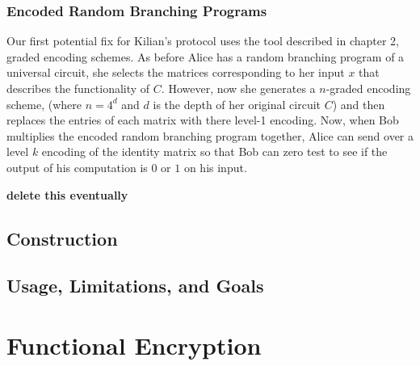 \documentclass[12pt,twoside]{reedthesis}
\begin{document}
    \subsection{Encoded Random Branching Programs}
    
    \par Our first potential fix for Kilian's protocol uses the tool described in chapter 2, graded encoding schemes. As before Alice has a random branching program of a universal circuit, she selects the matrices corresponding to her input $x$ that describes the functionality of $C$. However, now she generates a $n$-graded encoding scheme, (where $n= 4^d$ and $d$ is the depth of her original circuit $C$) and then replaces the entries of each matrix with there level-1 encoding. Now, when Bob multiplies the encoded random branching program together, Alice can send over a level $k$ encoding of the identity matrix so that Bob can zero test to see if the output of his computation is $0$ or $1$ on his input. 
    
    
    \textbf{delete this eventually} \cite{Garg:2013} \cite{GGH13} \cite{5genc}
     
   
    
    \section{Construction}
    \section{Usage, Limitations, and Goals}
    
    
    
    
    \chapter{Functional Encryption}
\end{document}
